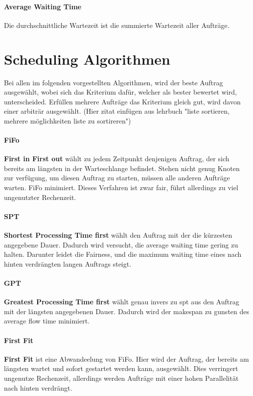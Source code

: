 \paragraph{Average Waiting Time}
Die durchschnittliche Wartezeit ist die summierte Wartezeit aller Aufträge.

\section{Scheduling Algorithmen}
Bei allen im folgenden vorgestellten Algorithmen, wird der beste Auftrag ausgewählt, wobei sich das Kriterium dafür, welcher als bester bewertet wird, unterscheided. Erfüllen mehrere Aufträge das Kriterium gleich gut, wird davon einer arbiträr ausgewählt. (Hier zitat einfügen aus lehrbuch "liste sortieren, mehrere möglichkeiten liste zu sortireren")

\paragraph{FiFo}
\textbf{First in First out} wählt zu jedem Zeitpunkt denjenigen Auftrag, der sich bereits am längsten in der Warteschlange befindet. Stehen nicht genug Knoten zur verfügung, um diesen Auftrag zu starten, müssen alle anderen Aufträge warten. FiFo minimiert. Dieses Verfahren ist zwar fair, führt allerdings zu viel ungenutzter Rechenzeit.

\paragraph{SPT}
\textbf{Shortest Processing Time first} wählt den Auftrag mit der die kürzesten angegebene Dauer. Dadurch wird versucht, die average waiting time gering zu halten. Darunter leidet die Fairness, und die maximum waiting time eines nach hinten verdrängten langen Auftrags steigt.

\paragraph{GPT}
\textbf{Greatest Processing Time first} wählt genau invers zu spt aus den Auftrag mit der längsten angegebenen Dauer. Dadurch wird der makespan zu gunsten des average flow time minimiert.

\paragraph{First Fit}
\textbf{First Fit} ist eine Abwandeelung von FiFo. Hier wird  der Auftrag, der bereits am längsten wartet und sofort gestartet werden kann, ausgewählt. Dies verringert ungenutze Rechenzeit, allerdings werden Aufträge mit einer hohen Parallelität nach hinten verdrängt.


